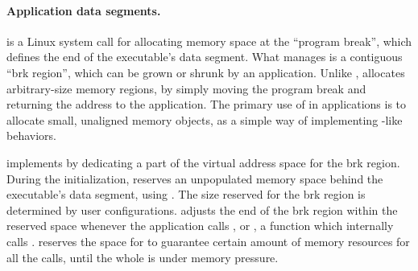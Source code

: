 \paragraph{Application data segments.}

 is a Linux system call for 
allocating memory space at the ``program break'', which defines the end of the executable's data segment.
What  manages is a contiguous ``brk region'', which can be grown or shrunk by an application.
Unlike ,  allocates arbitrary-size memory regions, by simply moving the program break
and returning the address to the application.
The primary use of  in applications is %
to allocate small, unaligned memory objects,
as a simple way of implementing -like behaviors.





\thelibos{} implements  by dedicating a part of the virtual address space for the brk region.
During the initialization, \thelibos{} reserves an unpopulated memory space
behind the executable's data segment, using .
The size reserved for the brk region is determined
by user configurations.
\thelibos{} adjusts the end of the brk region
within the reserved space
whenever the application calls , or , a \libc{} function which internally calls .
\thelibos{} reserves the space for 
to guarantee certain amount of memory resources for all the  calls,
until the whole \picoproc{} is under memory pressure.





